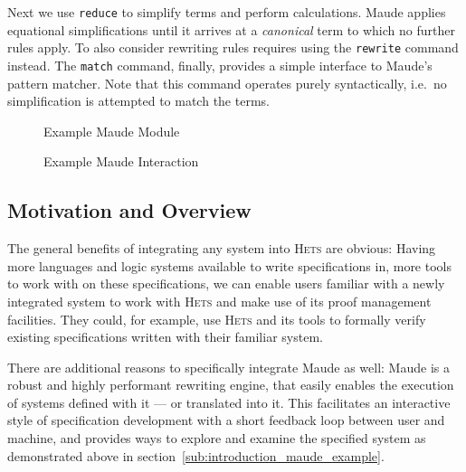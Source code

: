 \documentclass[11pt]{article}
\newcommand{\Hets}{\textsc{Hets}}
\begin{document}
Next we use \texttt{reduce} to simplify terms and perform calculations. Maude applies equational simplifications until it arrives at a \emph{canonical} term to which no further rules apply. To also consider rewriting rules requires using the \texttt{rewrite} command instead. The \texttt{match} command, finally, provides a simple interface to Maude's pattern matcher. Note that this command operates purely syntactically, i.e.\ no simplification is attempted to match the terms.

\begin{figure}
  \begin{minipage}[b]{0.5\textwidth}
    \begin{alltt}\footnotesize{}\end{alltt}
    \caption{Example Maude Module}\label{ex:maude-natlist}
  \end{minipage}
  \hspace{2.5mm}
  \begin{minipage}[b]{0.45\textwidth}
    \begin{alltt}\footnotesize{}\end{alltt}
    \caption{Example Maude Interaction}\label{tr:maude-natlist}
  \end{minipage}
\end{figure}


\subsection{Motivation and Overview}
\label{sub:introduction_overview}

The general benefits of integrating any system into \Hets{} are obvious: Having more languages and logic systems available to write specifications in, more tools to work with on these specifications, we can enable users familiar with a newly integrated system to work with \Hets{} and make use of its proof management facilities. They could, for example, use \Hets{} and its tools to formally verify existing specifications written with their familiar system.

There are additional reasons to specifically integrate Maude as well: Maude is a robust and highly performant rewriting engine, that easily enables the execution of systems defined with it --- or translated into it. This facilitates an interactive style of specification development with a short feedback loop between user and machine, and provides ways to explore and examine the specified system as demonstrated above in section~\ref{sub:introduction_maude_example}.
\end{document}
